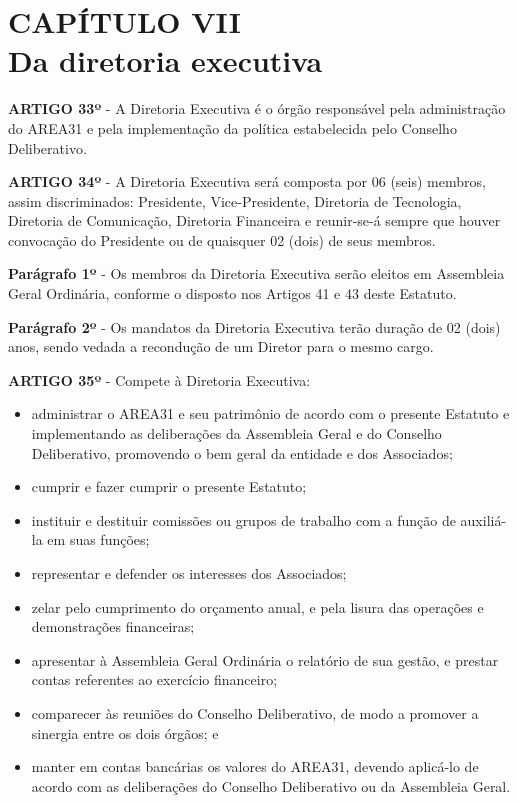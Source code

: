 \chapter*{CAPÍTULO VII \\ Da diretoria executiva}


\textbf{ARTIGO 33º} - A Diretoria Executiva é o órgão responsável pela 
administração do AREA31 e pela implementação da política 
estabelecida pelo Conselho Deliberativo.

\bigskip

\textbf{ARTIGO 34º} - A Diretoria Executiva será composta por 06 (seis) 
membros, assim discriminados: Presidente, Vice-Presidente, Diretoria de 
Tecnologia, Diretoria de Comunicação, Diretoria Financeira e reunir-se-á 
sempre que houver convocação do Presidente ou de quaisquer 
02 (dois) de seus membros.

\bigskip

\textbf{Parágrafo 1º} - Os membros da Diretoria Executiva serão eleitos em 
Assembleia Geral Ordinária, conforme o disposto nos Artigos 41 
e 43 deste Estatuto. 

\bigskip

\textbf{Parágrafo 2º} - Os mandatos da Diretoria Executiva terão duração de 
02 (dois) anos, sendo vedada a recondução de um Diretor para o mesmo cargo.

\bigskip

\textbf{ARTIGO 35º} - Compete à Diretoria Executiva:

\begin{itemize}
    \item administrar o AREA31 e seu patrimônio de acordo com o presente 
        Estatuto e implementando as deliberações da Assembleia Geral e do 
        Conselho Deliberativo, promovendo o bem geral da 
        entidade e dos Associados;
    \item cumprir e fazer cumprir o presente Estatuto;
    \item instituir e destituir comissões ou grupos de trabalho com a 
        função de auxiliá-la em suas funções;
    \item representar e defender os interesses dos Associados;
    \item zelar pelo cumprimento do orçamento anual, e pela lisura das 
        operações e demonstrações financeiras;
    \item apresentar à Assembleia Geral Ordinária o relatório de sua 
        gestão, e prestar contas referentes ao exercício financeiro;
    \item comparecer às reuniões do Conselho Deliberativo, 
        de modo a promover a sinergia entre os dois órgãos; e
    \item manter em contas bancárias os valores do AREA31, devendo aplicá-lo 
        de acordo com as deliberações do Conselho Deliberativo 
        ou da Assembleia Geral.
\end{itemize}

